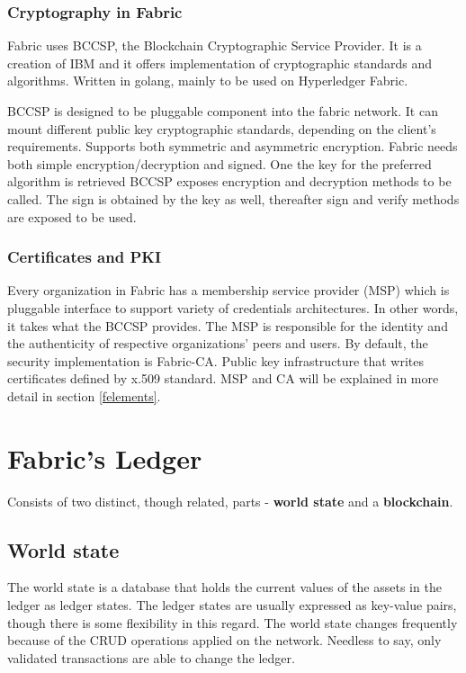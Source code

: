 \documentclass[a4paper,11pt]{report}
\begin{document}
\subsubsection{Cryptography in Fabric }

	Fabric uses BCCSP, the Blockchain Cryptographic Service Provider. It is a creation of IBM and it offers implementation of cryptographic standards and algorithms. Written in golang, mainly to be used on Hyperledger Fabric. 

	BCCSP is designed to be pluggable component into the fabric network. It can mount different public key cryptographic standards, depending on the client’s requirements. Supports both symmetric and asymmetric encryption. 
Fabric needs both simple encryption/decryption and signed. One the key for the preferred algorithm is retrieved BCCSP exposes encryption and decryption methods to be called. The sign is obtained by the key as well, thereafter sign and verify methods are exposed to be used. \cite{bccsp}


\subsubsection{Certificates and PKI}
	Every organization in Fabric has a membership service provider (MSP) which is pluggable interface to support variety of credentials architectures. In other words, it takes what the BCCSP provides. The MSP is responsible for the identity and the authenticity of respective organizations’ peers and users. By default, the security implementation is Fabric-CA. Public key infrastructure that writes certificates defined by x.509 standard. MSP and CA will be explained in more detail in section \ref{felements}.


\section{Fabric's Ledger}
\label{fabricLedger}
	Consists of two distinct, though related, parts - \textbf{world state} and  a \textbf{blockchain}.
	
\subsection{World state}
\label{ws}
The world state is a database that holds the current values of the assets in the ledger as ledger states. The ledger states are usually expressed as key-value pairs, though there is some flexibility in this regard. The world state changes frequently because of the CRUD operations applied on the network. Needless to say, only validated transactions are able to change the ledger.
\end{document}
